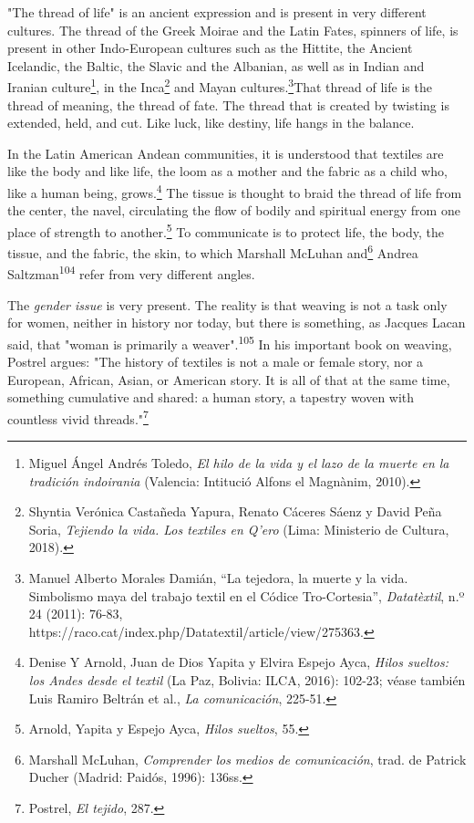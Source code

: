 \documentclass{tufte-handout}
\begin{document}
"The thread of life" is an ancient expression and is present in very
different cultures. The thread of the Greek Moirae and the Latin Fates,
spinners of life, is present in other Indo-European cultures such as the
Hittite, the Ancient Icelandic, the Baltic, the Slavic and the Albanian,
as well as in Indian and Iranian culture\footnote{Miguel Ángel Andrés
  Toledo, \emph{El hilo de la vida y el lazo de la muerte en la
  tradición indoirania} (Valencia: Intitució Alfons el Magnànim, 2010).},
in the Inca\footnote{Shyntia Verónica Castañeda Yapura, Renato Cáceres
  Sáenz y David Peña Soria, \emph{Tejiendo la vida. Los textiles en
  Q'ero} (Lima: Ministerio de Cultura, 2018).} and Mayan
cultures.\footnote{Manuel Alberto Morales Damián, ``La tejedora, la
  muerte y la vida. Simbolismo maya del trabajo textil en el Códice
  Tro-Cortesia'', \emph{Datatèxtil}, n.º 24 (2011): 76-83,
  https://raco.cat/index.php/Datatextil/article/view/275363.}That thread
of life is the thread of meaning, the thread of fate. The thread that is
created by twisting is extended, held, and cut. Like luck, like destiny,
life hangs in the balance.

In the Latin American Andean communities, it is understood that textiles
are like the body and like life, the loom as a mother and the fabric as
a child who, like a human being, grows.\footnote{Denise Y Arnold, Juan
  de Dios Yapita y Elvira Espejo Ayca, \emph{Hilos sueltos: los Andes
  desde el textil} (La Paz, Bolivia: ILCA, 2016): 102-23; véase también
  Luis Ramiro Beltrán et al., \emph{La comunicación}, 225-51.} The
tissue is thought to braid the thread of life from the center, the
navel, circulating the flow of bodily and spiritual energy from one
place of strength to another.\footnote{Arnold, Yapita y Espejo Ayca,
  \emph{Hilos sueltos}, 55.} To communicate is to protect life, the
body, the tissue, and the fabric, the skin, to which Marshall McLuhan
and\footnote{Marshall McLuhan, \emph{Comprender los medios de
  comunicación}, trad. de Patrick Ducher (Madrid: Paidós, 1996): 136ss.}
Andrea Saltzman\textsuperscript{104} refer
from very different angles.

The \emph{gender issue} is very present. The reality is that weaving is
not a task only for women, neither in history nor today, but there is
something, as Jacques Lacan said, that "woman is primarily a
weaver".\textsuperscript{105}
In his important book on weaving, Postrel argues: "The history of
textiles is not a male or female story, nor a European, African, Asian,
or American story. It is all of that at the same time, something
cumulative and shared: a human story, a tapestry woven with countless
vivid threads."\footnote{Postrel, \emph{El tejido}, 287.}
\end{document}
